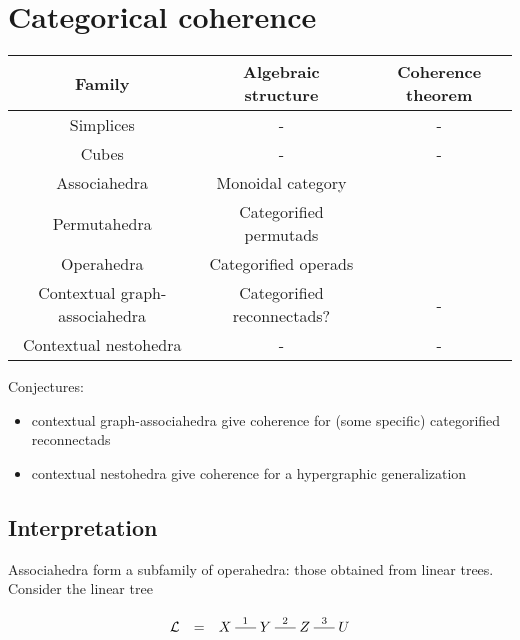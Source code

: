 
\section{Categorical coherence} 
\label{s:coherence}


\begin{table}[h!]
	\begin{center}
	\begin{tabular}{c|c|c}
	Family & Algebraic structure & Coherence theorem \\
	\hline
	Simplices & - & - \\
	Cubes & - & - \\
	Associahedra & Monoidal category & \cite{MacLane63} \\
	Permutahedra & Categorified permutads & \cite{CLA1} \\
	Operahedra & Categorified operads & \cite{DP15,CLA1} \\
	Contextual graph-associahedra & Categorified reconnectads? & - \\
	Contextual nestohedra & - & - 
	\end{tabular}
	\end{center}
\end{table}

Conjectures: 
\begin{itemize}
  \item contextual graph-associahedra give coherence for (some specific) categorified reconnectads \cite{DotsenkoKeilthyLyskov}
  \item contextual nestohedra give coherence for a hypergraphic generalization
\end{itemize}




\subsection{Interpretation}

Associahedra form a subfamily of operahedra: those obtained from linear trees.  Consider the linear tree

\vspace{-1cm}
\begin{center}
$$\xymatrix @-1.65pc {{\cal L} & = &X \ar @{-}[rr]^{1}&& Y \ar @{-}[rr]^{2}&& Z \ar @{-}[rr]^{3}&& U}
 $$
 \end{center}
 \vspace{-.2cm}
 
